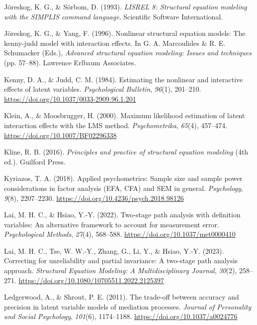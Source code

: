 \documentclass[
  man,mask]{apa6}
\newlength{\cslhangindent}
\newenvironment{CSLReferences}[2] %
 {\begin{list}{}{%
  \setlength{\itemindent}{0pt}
  \setlength{\leftmargin}{0pt}
  \setlength{\parsep}{0pt}
  \ifodd #1
   \setlength{\leftmargin}{\cslhangindent}
   \setlength{\itemindent}{-1\cslhangindent}
  \fi
  \setlength{\itemsep}{#2\baselineskip}}}
 {\end{list}}
\begin{document}
\begin{CSLReferences}{1}{0}
Jöreskog, K. G., \& Sörbom, D. (1993). \emph{LISREL 8: Structural equation modeling with the SIMPLIS command language}. Scientific Software International.

Jöreskog, K. G., \& Yang, F. (1996). Nonlinear structural equation models: The kenny-judd model with interaction effects. In G. A. Marcoulides \& R. E. Schumacker (Eds.), \emph{Advanced structural equation modeling: Issues and techniques} (pp. 57--88). Lawrence Erlbaum Associates.

Kenny, D. A., \& Judd, C. M. (1984). Estimating the nonlinear and interactive effects of latent variables. \emph{Psychological Bulletin}, \emph{96}(1), 201--210. \url{https://doi.org/10.1037/0033-2909.96.1.201}

Klein, A., \& Moosbrugger, H. (2000). Maximum likelihood estimation of latent interaction effects with the {LMS} method. \emph{Psychometrika}, \emph{65}(4), 457--474. \url{https://doi.org/10.1007/BF02296338}

Kline, R. B. (2016). \emph{Principles and practice of structural equation modeling} (4th ed.). Guilford Press.

Kyriazos, T. A. (2018). Applied psychometrics: Sample size and sample power considerations in factor analysis (EFA, CFA) and SEM in general. \emph{Psychology}, \emph{9}(8), 2207--2230. \url{https://doi.org/10.4236/psych.2018.98126}

Lai, M. H. C., \& Hsiao, Y.-Y. (2022). Two-stage path analysis with definition variables: {An} alternative framework to account for measurement error. \emph{Psychological Methods}, \emph{27}(4), 568--588. \url{https://doi.org/10.1037/met0000410}

Lai, M. H. C., Tse, W. W.-Y., Zhang, G., Li, Y., \& Hsiao, Y.-Y. (2023). Correcting for unreliability and partial invariance: {A} two-stage path analysis approach. \emph{Structural Equation Modeling: A Multidisciplinary Journal}, \emph{30}(2), 258--271. \url{https://doi.org/10.1080/10705511.2022.2125397}

Ledgerwood, A., \& Shrout, P. E. (2011). The trade-off between accuracy and precision in latent variable models of mediation processes. \emph{Journal of Personality and Social Psychology}, \emph{101}(6), 1174--1188. \url{https://doi.org/10.1037/a0024776}


\end{CSLReferences}
\end{document}
